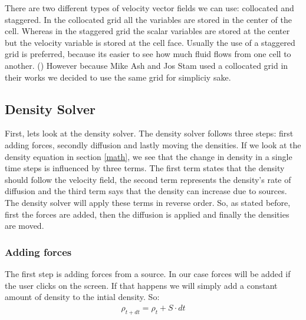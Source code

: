 \documentclass[a4paper,12pt]{article}
\begin{document}
There are two different types of velocity vector fields we can use: collocated and staggered.
In the collocated grid all the variables are stored in the center of the cell. 
Whereas in the staggered grid the scalar variables are stored at the center but the velocity variable is stored at the cell face. 
Usually the use of a staggered grid is preferred, because its easier to see how much fluid flows from one cell to another. (\cite{tenminute})
However because Mike Ash and Jos Stam used a collocated grid in their works we decided to use the same grid for simpliciy sake.

\subsection{Density Solver} \label{density}

First, lets look at the density solver. The density solver follows three steps: first adding forces, secondly diffusion and lastly moving the densities. 
If we look at the density equation in section \ref{math}, we see that the change in density in a single time steps is influenced by three terms. 
The first term states that the density should follow the velocity field,
the second term represents the density's rate of diffusion
and the third term says that the density can increase due to sources. 
The density solver will apply these terms in reverse order. 
So, as stated before, first the forces are added, then the diffusion is applied and finally the densities are moved.

\subsubsection{Adding forces}
The first step is adding forces from a source. In our case forces will be added if the user clicks on the screen.
If that happens we will simply add a constant amount of density to the intial density. So:
\[
\begin{array}{ll}
  \rho_{t+dt} = \rho_t + S \cdot dt
\end{array}
\]
\end{document}
